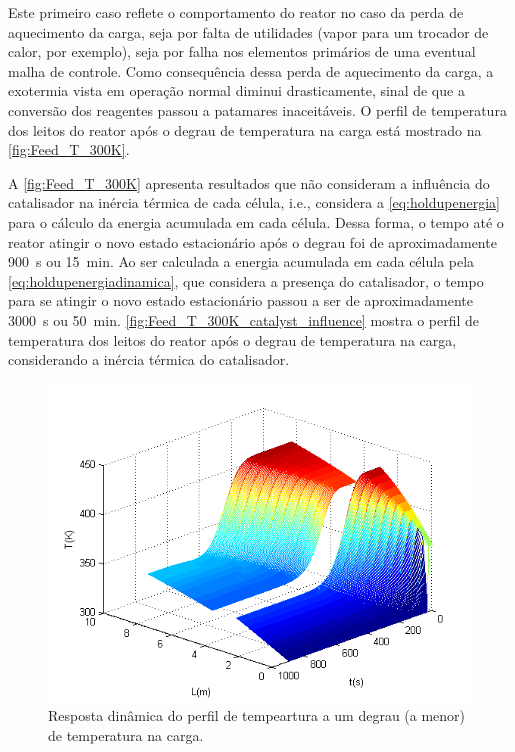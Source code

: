 Este primeiro caso reflete o comportamento do reator no caso da perda de
aquecimento da carga, seja por falta de utilidades (vapor para um trocador de
calor, por exemplo), seja por falha nos elementos primários de uma eventual
malha de controle. Como consequência dessa perda de aquecimento da carga, a
exotermia vista em operação normal diminui drasticamente, sinal de que a
conversão dos reagentes passou a patamares inaceitáveis. O perfil de temperatura
dos leitos do reator após o degrau de temperatura na carga está mostrado na
\autoref{fig:Feed_T_300K}.

A \autoref{fig:Feed_T_300K} apresenta resultados que não consideram a influência
do catalisador na inércia térmica de cada célula, i.e., considera a
\autoref{eq:holdupenergia} para o cálculo da energia acumulada em cada célula.
Dessa forma, o tempo até o reator atingir o novo estado estacionário após o
degrau foi de aproximadamente \SI{900}{s} ou \SI{15}{min}. Ao ser calculada a
energia acumulada em cada célula pela \autoref{eq:holdupenergiadinamica}, que
considera a presença do catalisador, o tempo para se atingir o novo estado
estacionário passou a ser de aproximadamente \SI{3000}{s} ou \SI{50}{min}.
\autoref{fig:Feed_T_300K_catalyst_influence} mostra o perfil de temperatura dos
leitos do reator após o degrau de temperatura na carga, considerando a inércia
térmica do catalisador.
\begin{figure}[htb]
\centering
\includegraphics[scale=0.8]{images/Chap4/Feed_T_300K.png}
\caption{Resposta dinâmica do perfil de tempeartura a um degrau (a menor) de
temperatura na carga.}
\label{fig:Feed_T_300K}
\end{figure}
